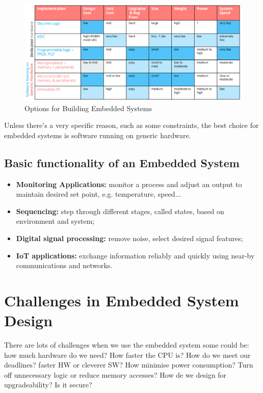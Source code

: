 \begin{figure}[H]
    \centering
    \includegraphics[width=1\linewidth]{img/img4.png}
    \caption{Options for Building Embedded Systems}
\end{figure}

Unless there's a very specific reason, such as some constraints, the best choice for embedded systems is
software running on generic hardware.


\subsection{Basic functionality of an Embedded System}

\begin{itemize}
    \item[] \textbf{Monitoring Applications: } monitor a process and adjust an output to maintain desired set point, e.g. temperature, speed...
    \item[] \textbf{Sequencing: } step through different stages, called states, based on environment and system;
    \item[] \textbf{Digital signal processing: } remove noise, select desired signal features;
    \item[]  \textbf{IoT applications: } exchange information reliably and quickly using near-by communications and networks.
\end{itemize}

\section{Challenges in Embedded System Design}

There are lots of challenges when we use the embedded system some could be: how much hardware do we need? How faster the CPU is? How do we meet our deadlines? faster HW or cleverer SW? How minimise power consumption? Turn off unnecessary logic or reduce memory accesses? How de we design for upgradeability? Is it secure?


